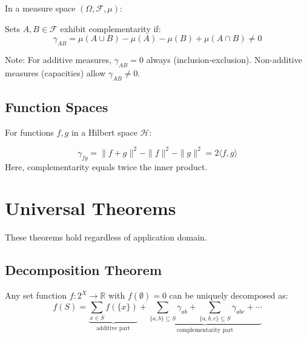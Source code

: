 In a measure space $(\Omega, \mathcal{F}, \mu)$:

\begin{definition}
Sets $A, B \in \mathcal{F}$ exhibit complementarity if:
\begin{equation}
\gamma_{AB} = \mu(A \cup B) - \mu(A) - \mu(B) + \mu(A \cap B) \neq 0
\end{equation}
\end{definition}

Note: For additive measures, $\gamma_{AB} = 0$ always (inclusion-exclusion). Non-additive measures (capacities) allow $\gamma_{AB} \neq 0$.

\subsection{Function Spaces}

For functions $f, g$ in a Hilbert space $\mathcal{H}$:

\begin{definition}
\begin{equation}
\gamma_{fg} = \|f + g\|^2 - \|f\|^2 - \|g\|^2 = 2\langle f, g \rangle
\end{equation}
Here, complementarity equals twice the inner product.
\end{definition}

\section{Universal Theorems}
\label{sec:universal-theorems}

These theorems hold regardless of application domain.

\subsection{Decomposition Theorem}

\begin{theorem}
\label{thm:decomposition}
Any set function $f: 2^X \to \mathbb{R}$ with $f(\emptyset) = 0$ can be uniquely decomposed as:
\begin{equation}
f(S) = \underbrace{\sum_{x \in S} f(\{x\})}_{\text{additive part}} + \underbrace{\sum_{\{a,b\} \subseteq S} \gamma_{ab} + \sum_{\{a,b,c\} \subseteq S} \gamma_{abc} + \cdots}_{\text{complementarity part}}
\label{eq:decomposition}
\end{equation}
\end{theorem}

